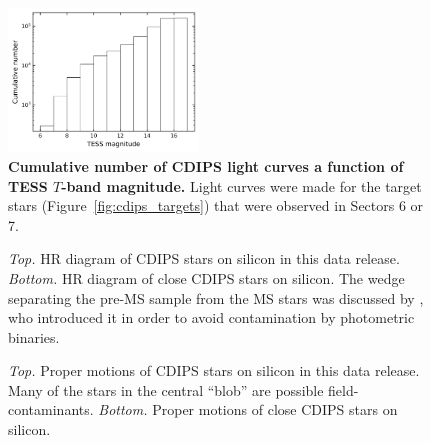 \documentclass[12pt,twocolumn,tighten]{aastex62}
\begin{document}
\begin{figure}[!t]
	\begin{center}
		\leavevmode
		\includegraphics[width=0.45\textwidth]{cdf_T_mag.png}
	\end{center}
	\vspace{-0.5cm}
	\caption{
		{\bf Cumulative number of CDIPS light curves a function of TESS
			$T$-band magnitude.}  Light curves were made for the
		target stars (Figure~\ref{fig:cdips_targets}) that were observed
		in Sectors 6 or 7.
		\label{fig:cdf_T_mag}
	}
\end{figure}

\begin{figure}[!ht]
	\vspace{-0.8cm}
	\vspace{-0.8cm}
	\caption{
		{\it Top.} HR diagram of CDIPS stars on silicon in this
		data release.  {\it Bottom.} HR diagram of close CDIPS stars on
		silicon. The wedge separating the pre-MS sample from the MS
		stars was discussed by \citet{zari_3d_2018}, who introduced it in
		order to avoid contamination by photometric binaries.
	}
	\label{fig:hrd}
\end{figure}

\begin{figure}[!t]
	\vspace{-0.8cm}
	\vspace{-0.8cm}
	\caption{
		{\it Top.} Proper motions of CDIPS stars on silicon in this
		data release.  Many of the stars in the central ``blob'' are possible
		field-contaminants.
		{\it Bottom.} Proper motions of close CDIPS stars
		on silicon.
	}
	\label{fig:propermotions}
\end{figure}
\end{document}
